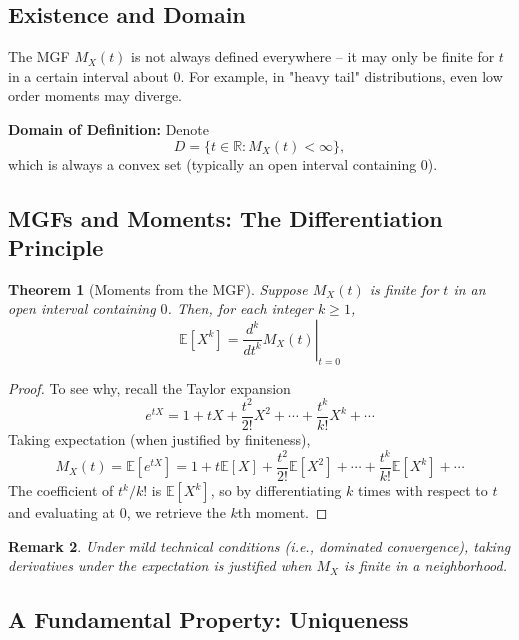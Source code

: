 \documentclass[12pt]{article}
\newtheorem{theorem}{Theorem}[section]
\newtheorem{remark}[theorem]{Remark}
\begin{document}
\subsection{Existence and Domain}
The MGF $M_X(t)$ is not always defined everywhere -- it may only be finite for $t$ in a certain interval about $0$. For example, in "heavy tail" distributions, even low order moments may diverge.

\vspace{1em}
\noindent\textbf{Domain of Definition:} Denote
\[
    D = \{ t \in \mathbb{R} : M_X(t) < \infty \},
\]
which is always a convex set (typically an open interval containing $0$).

\subsection{MGFs and Moments: The Differentiation Principle}

\begin{theorem}[Moments from the MGF]\label{thm:mgf-moments}
    Suppose $M_X(t)$ is finite for $t$ in an open interval containing $0$. Then, for each integer $k\ge1$,
    \begin{equation}
        \mathbb{E}[X^k] = \left. \frac{d^k}{dt^k} M_X(t) \right|_{t=0}
    \end{equation}
\end{theorem}
\begin{proof}
    To see why, recall the Taylor expansion
    \[
      e^{tX} = 1 + t X + \frac{t^2}{2!}X^2 + \dotsb + \frac{t^k}{k!}X^k + \cdots
    \]
    Taking expectation (when justified by finiteness),
    \[
      M_X(t) = \mathbb{E}[e^{tX}] = 1 + t \mathbb{E}[X] + \frac{t^2}{2!}\mathbb{E}[X^2] + \cdots + \frac{t^k}{k!}\mathbb{E}[X^k] + \cdots
    \]
    The coefficient of $t^k/k!$ is $\mathbb{E}[X^k]$, so by differentiating $k$ times with respect to $t$ and evaluating at $0$, we retrieve the $k$th moment.
\end{proof}

\begin{remark}
    Under mild technical conditions (i.e., dominated convergence), taking derivatives under the expectation is justified when $M_X$ is finite in a neighborhood.
\end{remark}

\subsection{A Fundamental Property: Uniqueness}
\end{document}
